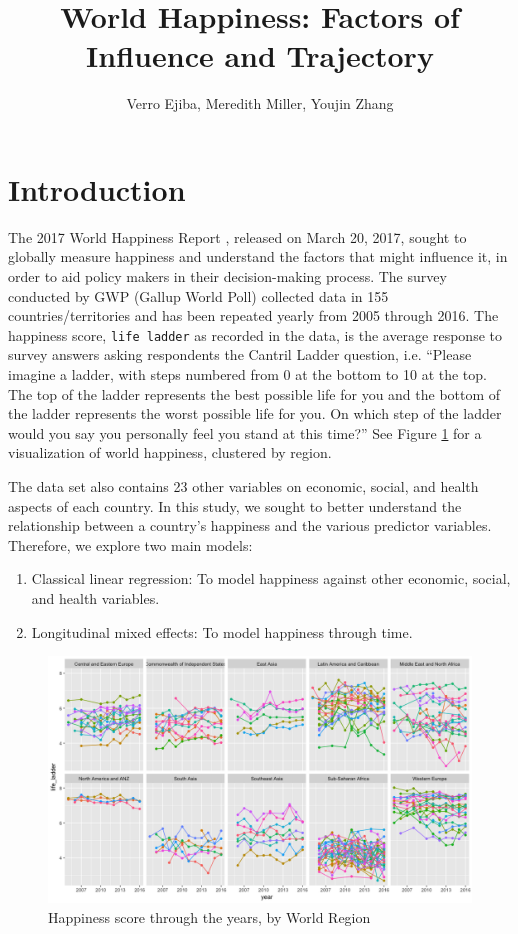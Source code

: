 \documentclass{article}
\title{World Happiness: Factors of Influence and Trajectory}
\author{Verro Ejiba, Meredith Miller, Youjin Zhang}
\begin{document}
\maketitle

\section{Introduction}
The 2017 World Happiness Report \cite{worldhappinessreport}, released on March 20, 2017, sought to globally measure happiness and understand the factors that might influence it, in order to aid policy makers in their decision-making process. The survey conducted by GWP (Gallup World Poll) collected data in 155 countries/territories and has been repeated yearly from 2005 through 2016. The happiness score, \texttt{life ladder} as recorded in the data, is the average response to survey answers asking respondents the Cantril Ladder question, i.e. “Please imagine a ladder, with steps numbered from 0 at the bottom to 10 at the top. The top of the ladder represents the best possible life for you and the bottom of the ladder represents the worst possible life for you. On which step of the ladder would you say you personally feel you stand at this time?” See Figure \ref{fig:long} for a visualization of world happiness, clustered by region.

The data set also contains 23 other variables on economic, social, and health aspects of each country. In this study, we sought to better understand the relationship between a country's happiness and the various predictor variables. Therefore, we explore two main models: 
\begin{enumerate}
	\item Classical linear regression: To model happiness against other economic, social, and health variables.
    \item Longitudinal mixed effects: To model happiness through time.
\end{enumerate}

\begin{figure}
\centering
\includegraphics[scale=.45]{longitudinal.png}
\caption{\label{fig:long}Happiness score through the years, by World Region}
\end{figure}
\end{document}
